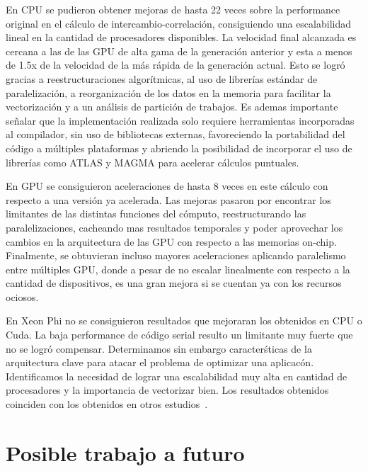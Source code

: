 En CPU se pudieron obtener mejoras de hasta 22 veces sobre la performance original en el c\'alculo de intercambio-correlaci\'on,
consiguiendo una escalabilidad lineal en la cantidad de procesadores disponibles. La velocidad final alcanzada es cercana a las de las GPU de alta gama
de la generaci\'on anterior y esta a menos de 1.5x de la velocidad de la m\'as r\'apida de la generaci\'on actual.
Esto se logr\'o gracias a reestructuraciones algor\'itmicas, al uso de librer\'ias est\'andar de paralelizaci\'on,
a reorganizaci\'on de los datos en la memoria para facilitar la vectorizaci\'on y a un an\'alisis de partici\'on de trabajos.
Es ademas importante se\~nalar que la implementaci\'on realizada solo requiere herramientas incorporadas al compilador,
sin uso de bibliotecas externas, favoreciendo la portabilidad del c\'odigo a m\'ultiples plataformas y abriendo la posibilidad
de incorporar el uso de librer\'ias como ATLAS y MAGMA para acelerar c\'alculos puntuales.

En GPU se consiguieron aceleraciones de hasta 8 veces en este c\'alculo con respecto a una versi\'on ya acelerada.
Las mejoras pasaron por encontrar los limitantes de las distintas funciones del c\'omputo, reestructurando las paralelizaciones,
cacheando mas resultados temporales y poder aprovechar los cambios en la arquitectura de las GPU con respecto a las memorias
on-chip. Finalmente, se obtuvieran incluso mayores aceleraciones aplicando paralelismo entre m\'ultiples
GPU, donde a pesar de no escalar linealmente con respecto a la cantidad de dispositivos, es una gran mejora
si se cuentan ya con los recursos ociosos.

En Xeon Phi no se consiguieron resultados que mejoraran los obtenidos en CPU o
Cuda. La baja performance de c\'odigo serial resulto un limitante muy
fuerte que no se logr\'o compensar. Determinamos sin embargo caracter\'sticas
de la arquitectura clave para atacar el problema de optimizar una aplicac\'on.
Identificamos la necesidad de lograr una escalabilidad muy alta en cantidad de
procesadores y la importancia de vectorizar bien.  Los resultados obtenidos
coinciden con los obtenidos en otros estudios~\cite{Jeffers}.

\section{Posible trabajo a futuro}

